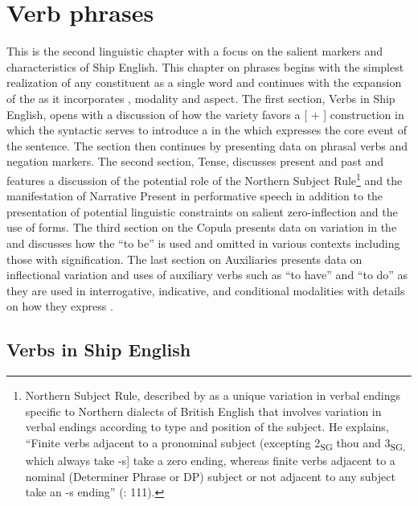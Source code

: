 \chapter{{Verb phrases}}

This is the second linguistic chapter with a focus on the salient markers and characteristics of Ship English. This chapter on  phrases begins with the simplest realization of any  constituent as a single word and continues with the expansion of the  as it incorporates , modality and aspect. The first section, Verbs in Ship English, opens with a discussion of how the variety favors a [ + ] construction in which the syntactic  serves to introduce a  in the  which expresses the core event of the sentence.  The section then continues by presenting data on phrasal verbs and negation markers. The second section, Tense, discusses present and past  and features a discussion of the potential role of the Northern Subject Rule\footnote{Northern Subject Rule, described by  \citet{deHaas2006} as a unique variation in verbal endings specific to Northern dialects of British English that involves variation in verbal endings according to type and position of the subject. He explains, “Finite verbs adjacent to a pronominal subject (excepting 2\textsubscript{SG} thou and 3\textsubscript{SG,} which always take -s] take a zero ending, whereas finite verbs adjacent to a nominal (Determiner Phrase or DP) subject or not adjacent to any subject take an -s ending” (\citealt{deHaas2006}: 111).} and the manifestation of Narrative Present in performative speech in addition to the presentation of potential linguistic constraints on salient zero-inflection and the use of  forms. The third section on the Copula presents data on variation in the  and discusses how the  “to be” is used and omitted in various contexts including those with  signification. The last section on Auxiliaries presents data on inflectional variation and uses of auxiliary verbs such as “to have” and “to do” as they are used in interrogative, indicative, and conditional modalities with details on how they express . 

\section{{Verbs in Ship English}}\label{sec:6.1}

